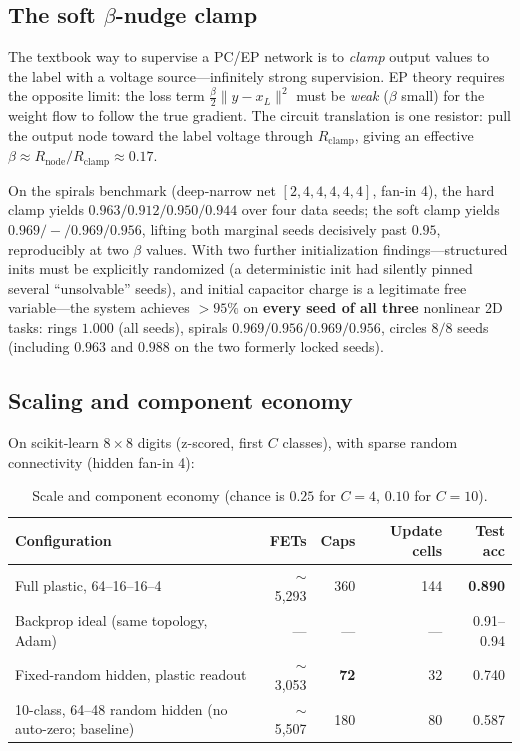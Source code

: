\documentclass[11pt]{article}
\begin{document}
\subsection{The soft $\beta$-nudge clamp}
\label{sec:softclamp}

The textbook way to supervise a PC/EP network is to \emph{clamp} output values to the label with a voltage source---infinitely strong supervision. EP theory \cite{scellier2017} requires the opposite limit: the loss term $\frac{\beta}{2}\lVert y - x_L\rVert^2$ must be \emph{weak} ($\beta$ small) for the weight flow to follow the true gradient. The circuit translation is one resistor: pull the output node toward the label voltage through $R_{\text{clamp}}$, giving an effective $\beta \approx R_{\text{node}}/R_{\text{clamp}} \approx 0.17$.

On the spirals benchmark (deep-narrow net $[2,4,4,4,4,4]$, fan-in 4), the hard clamp yields $0.963/0.912/0.950/0.944$ over four data seeds; the soft clamp yields $\mathbf{0.969/-/0.969/0.956}$, lifting both marginal seeds decisively past $0.95$, reproducibly at two $\beta$ values. With two further initialization findings---structured inits must be explicitly randomized (a deterministic init had silently pinned several ``unsolvable'' seeds), and initial capacitor charge is a legitimate free variable---the system achieves $>\!95\%$ on \textbf{every seed of all three} nonlinear 2D tasks: rings $1.000$ (all seeds), spirals $0.969/0.956/0.969/0.956$, circles $8/8$ seeds (including $0.963$ and $0.988$ on the two formerly locked seeds).

\subsection{Scaling and component economy}
\label{sec:scaling}

On scikit-learn $8{\times}8$ digits (z-scored, first $C$ classes), with sparse random connectivity (hidden fan-in 4):

\begin{table}[h]
\centering\small
\begin{tabular}{lrrrr}
\toprule
Configuration & FETs & Caps & Update cells & Test acc \\
\midrule
Full plastic, 64--16--16--4 & $\sim$5{,}293 & 360 & 144 & \textbf{0.890} \\
Backprop ideal (same topology, Adam) & --- & --- & --- & 0.91--0.94 \\
Fixed-random hidden, plastic readout & $\sim$3{,}053 & \textbf{72} & 32 & 0.740 \\
10-class, 64--48 random hidden (no auto-zero; baseline) & $\sim$5{,}507 & 180 & 80 & 0.587 \\
\bottomrule
\end{tabular}
\caption{Scale and component economy (chance is $0.25$ for $C{=}4$, $0.10$ for $C{=}10$).}
\label{tab:scale}
\end{table}
\end{document}
